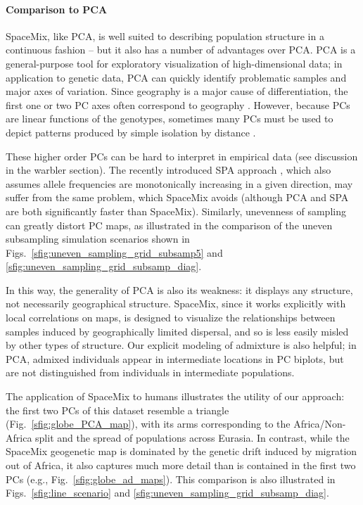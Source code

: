 \documentclass[10pt,letterpaper]{article}
\begin{document}
\paragraph{Comparison to PCA}
SpaceMix, like PCA, is well suited to describing population structure in a continuous fashion --
but it also has a number of advantages over PCA. 
PCA is a general-purpose tool for exploratory visualization of high-dimensional data;
in application to genetic data, PCA can quickly identify problematic samples and major axes of variation.  
Since geography is a major cause of differentiation, the first one or two PC axes often correspond to geography \cite{novembre_interpreting_2008}.  
However, because PCs are linear functions of the genotypes,
sometimes many PCs must be used to depict patterns produced by simple isolation by distance \cite{novembre_interpreting_2008}. 

These higher order PCs can be hard to interpret in empirical data (see discussion in the warbler section).
The recently introduced SPA approach \cite{yang_model-based_2012},
which also assumes allele frequencies are monotonically increasing in a given direction,
may suffer from the same problem, which SpaceMix avoids
(although PCA and SPA are both significantly faster than SpaceMix).  
Similarly, unevenness of sampling can greatly distort PC maps, 
as illustrated in the comparison of the uneven subsampling simulation scenarios 
shown in Figs.\ \ref{sfig:uneven_sampling_grid_subsamp5} and \ref{sfig:uneven_sampling_grid_subsamp_diag}.

In this way, the generality of PCA is also its weakness: 
it displays any structure, not necessarily geographical structure. 
SpaceMix, since it works explicitly with local correlations on maps, 
is designed to visualize the relationships between samples induced by geographically limited dispersal,
and so is less easily misled by other types of structure.
Our explicit modeling of admixture is also helpful; in PCA, admixed individuals appear in intermediate locations in PC biplots, 
but are not distinguished from individuals in intermediate populations.

The application of SpaceMix to humans illustrates the utility of our approach: 
the first two PCs of this dataset resemble a triangle (Fig.\ \ref{sfig:globe_PCA_map}), 
with its arms corresponding to the Africa/Non-Africa split and the spread of populations across Eurasia. 
In contrast, while the SpaceMix geogenetic map is dominated by the genetic drift induced by migration out of Africa,
it also captures much more detail than is contained in the first two PCs (e.g., Fig.\ \ref{sfig:globe_ad_maps}).
This comparison is also illustrated in Figs.\ \ref{sfig:line_scenario} and \ref{sfig:uneven_sampling_grid_subsamp_diag}.
\end{document}
